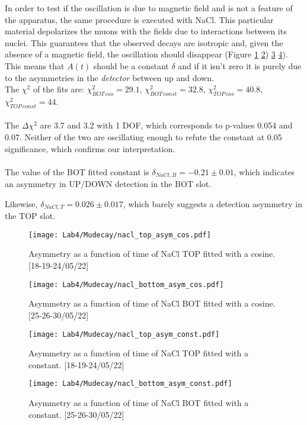 \documentclass[10pt,a4paper,twocolumn]{article}
\begin{document}
In order to test if the oscillation is due to magnetic field and is not a feature of the apparatus, the same procedure is executed with NaCl. This particular material depolarizes the muons with the fields due to interactions between its nuclei. This guarantees that the observed decays are isotropic and, given the absence of a magnetic field, the oscillation should disappear (Figure \ref{NACL_TOP_AS}  \ref{NACL_BOT_AS}) \ref{NACL_TOP_AS_CONST}  \ref{NACL_BOT_AS_CONST}). This means that $A(t)$ should be a constant $\delta$ and if it isn't zero it is purely due to the asymmetries in the \textit{detector} between up and down.
\\
The $\chi^2$ of the fits are: $\chi^2_{BOT \, cos} = 29.1$,  $\chi^2_{BOT \, const} = 32.8$, $\chi^2_{TOP \, cos} = 40.8$,  $\chi^2_{TOP \, const} = 44$.
\\
\\
The $\Delta \chi^2$ are 3.7 and 3.2 with 1 DOF, which corresponds to p-values 0.054 and 0.07. Neither of the two are oscillating enough to refute the constant at 0.05 significance, which confirms our interpretation.
\\
\\
The value of the BOT fitted constant is $\delta_{NaCl,B}=-0.21 \pm 0.01$, which indicates an asymmetry in UP/DOWN detection in the BOT slot. 

Likewise,  $\delta_{NaCl,T}=0.026 \pm 0.017$, which barely suggests a detection asymmetry in the TOP slot.


\begin{figure}[h!]
\centering
\caption{Asymmetry as a function of time of NaCl TOP fitted with a cosine. [18-19-24/05/22]}
\texttt{[image: Lab4/Mudecay/nacl\_top\_asym\_cos.pdf]} 
\label{NACL_TOP_AS}
\end{figure}

\begin{figure}[h!]
\centering
\caption{Asymmetry as a function of time of NaCl BOT fitted with a cosine. [25-26-30/05/22]}
\texttt{[image: Lab4/Mudecay/nacl\_bottom\_asym\_cos.pdf]} 
\label{NACL_BOT_AS}
\end{figure}

\begin{figure}[h!]
\centering
\caption{Asymmetry as a function of time of NaCl TOP fitted with a constant. [18-19-24/05/22]}
\texttt{[image: Lab4/Mudecay/nacl\_top\_asym\_const.pdf]} 
\label{NACL_TOP_AS_CONST}
\end{figure}

\begin{figure}[h!]
\centering
\caption{Asymmetry as a function of time of NaCl BOT fitted with a constant. [25-26-30/05/22]}
\texttt{[image: Lab4/Mudecay/nacl\_bottom\_asym\_const.pdf]} 
\label{NACL_BOT_AS_CONST}
\end{figure}
\end{document}
